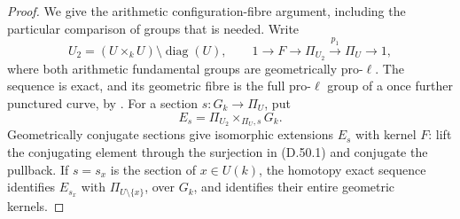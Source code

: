 \begin{proof}
We give the arithmetic configuration-fibre argument,
including the particular comparison of groups that
is needed. Write
\[
 U_2=(U\times_k U)\setminus\operatorname{diag}(U),
 \qquad
 1\longrightarrow F\longrightarrow\Pi_{U_2}
   \xrightarrow{p_1}\Pi_U\longrightarrow1,
                                                               \tag{D.50.1}
\]
where both arithmetic fundamental groups are
geometrically pro-\(\ell\).
The sequence is exact, and its geometric fibre is
the full pro-\(\ell\) group of a once further punctured
curve, by \cite[Definition 1.3 and
Proposition 1.4(i)]{DE_Wakabayashi2012}.
For a section \(s:G_k\to\Pi_U\), put
\[
 E_s=\Pi_{U_2}\times_{\Pi_U,s}G_k .
                                                               \tag{D.50.2}
\]
Geometrically conjugate sections give isomorphic
extensions \(E_s\) with kernel \(F\): lift the
conjugating element through the surjection in
(D.50.1) and conjugate the pullback.
If \(s=s_x\) is the section of \(x\in U(k)\),
the homotopy exact sequence identifies \(E_{s_x}\)
with \(\Pi_{U\setminus\{x\}}\), over \(G_k\),
and identifies their entire geometric kernels.


\end{proof}
